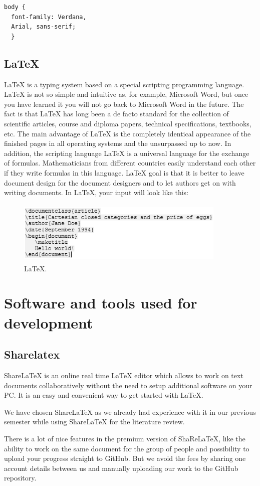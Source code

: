 \begin{verbatim}
body {
  font-family: Verdana, 
  Arial, sans-serif;
  }
\end{verbatim}

\subsection{LaTeX}
LaTeX is a typing system based on a special scripting programming language. LaTeX is not so simple and intuitive as, for example, Microsoft Word, but once you have learned it you will not go back to Microsoft Word in the future. The fact is that LaTeX has long been a de facto standard for the collection of scientific articles, course and diploma papers, technical specifications, textbooks, etc. The main advantage of LaTeX is the completely identical appearance of the finished pages in all operating systems and the unsurpassed up to now. In addition, the scripting language LaTeX is a universal language for the exchange of formulas. Mathematicians from different countries easily understand each other if they write formulas in this language.
LaTeX goal is that it is better to leave document design for the document designers and to let authors get on with writing documents. In LaTeX, your  input will look like this: \cite{LaTeX}

\begin{figure}[h]
\centering
\includegraphics[width=10cm, height=3cm]{img/Letex.PNG}
\caption{LaTeX.}
\end{figure}

\section{Software and tools used for development}

\subsection{Sharelatex}
ShareLaTeX is an online real time LaTeX editor which allows to work on text documents collaboratively without the need to setup additional software on your PC. It is an easy and convenient way to get started with LaTeX. \cite{Sharelatex}\par
We have chosen ShareLaTeX as we already had experience with it in our previous semester while using ShareLaTeX for the literature review.\par
There is a lot of nice features in the premium version of ShaReLaTeX, like the ability to work on the same document for the group of people and possibility to upload your progress straight to GitHub. But we avoid the fees by sharing one account details between us and manually uploading our work to the GitHub repository.

